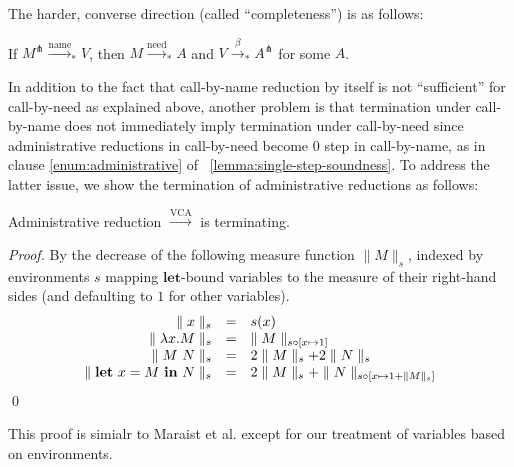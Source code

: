 \documentclass{llncs}
\newcommand{\LET}[3]{\mathbf{let}~#1=#2~\mathbf{in}~#3}
\newcommand{\EXPANDLET}[1]{#1^\pitchfork}
\newcommand{\SIZE}[2]{\parallel #1 \parallel_{#2}}
\newcommand{\FULLBETA}{\xrightarrow{\beta}}
\newcommand{\CALLBYNAME}{\xrightarrow{\mathrm{name}}}
\newcommand{\CALLBYNEED}{\xrightarrow{\mathrm{need}}}
\newcommand{\CALLBYNEEDVCA}{\xrightarrow{\mathrm{VCA}}}
\newcommand{\RTCLOS}[1]{#1_*}
\begin{document}
The harder, converse direction (called ``completeness'') is as follows:
%
\begin{theorem}[completeness]\label{theorem:completeness}
	If $\EXPANDLET{M} \RTCLOS{\CALLBYNAME} V$, then $M \RTCLOS{\CALLBYNEED} A$ and $V \RTCLOS{\FULLBETA} \EXPANDLET{A}$ for some $A$.
\end{theorem}

In addition to the fact that call-by-name reduction by itself is not ``sufficient'' for call-by-need as explained above, another problem is that termination under call-by-name does not immediately imply termination under call-by-need since administrative reductions in call-by-need become 0 step in call-by-name, as in clause \ref{enum:administrative} of \lemmaname~\ref{lemma:single-step-soundness}.
To address the latter issue, we show the termination of administrative reductions as follows:
%
\begin{lemma}\label{lemma:VCA-terminates}
	Administrative reduction $\CALLBYNEEDVCA$ is terminating.
\end{lemma}
%
\begin{proof}
	By the decrease of the following measure function $\SIZE{M}{s}$, indexed by environments $s$ mapping $\mathbf{let}$-bound variables to the measure of their right-hand sides (and defaulting to $1$ for other variables).
	\[ \begin{array}{rcl}
		\SIZE{x}{s} & = & s(x) \\
		\SIZE{\lambda x. M}{s} & = & \SIZE{M}{s \circ [x \mapsto 1]} \\
		\SIZE{M~N}{s} & = & 2\SIZE{M}{s}+2\SIZE{N}{s} \\
		\SIZE{\LET{x}{M}{N}}{s} & = & 2\SIZE{M}{s}+\SIZE{N}{s \circ [x \mapsto 1+\SIZE{M}{s}]}
	\end{array}\vspace{-\baselineskip} \]\qed %
\end{proof}
%
This proof is simialr to Maraist et al. \cite[p. 287]{Maraist98} except for our treatment of variables based on environments.
\end{document}
